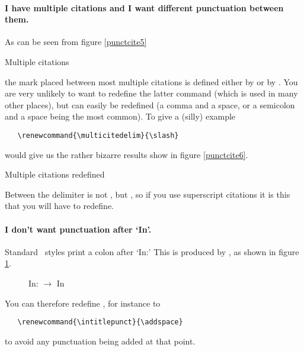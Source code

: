 \paragraph{I have multiple citations and I want different punctuation between them.} As can be seen from figure \ref{punctcite5}
\begin{marginfigure}[4ex]
\vspace{3pt}%
\caption{Multiple citations}\label{punctcite5}
\end{marginfigure}
the mark placed between most multiple citations is defined either by  or by . You are very unlikely to want to redefine the latter command (which is used in many other places), but  can easily be redefined (a comma and a space, or a semicolon and a space being the most common). To give a (silly) example
\begin{Verbatim}
   \renewcommand{\multicitedelim}{\slash}
\end{Verbatim}
would give us the rather bizarre results show in figure \ref{punctcite6}.
\begin{marginfigure}[-8ex]
\vspace{3pt}%
\caption{Multiple citations redefined}\label{punctcite6}
\end{marginfigure}

Between  the delimiter is not , but , so if you use superscript citations it is this that you will have to redefine.

\paragraph{I don't want punctuation after `In'.} Standard \biblatex\ styles print a colon after `In:' This is produced by , as shown in figure \ref{punctcite7}.
\begin{figure}
\caption{In: $\rightarrow$ In}\label{punctcite7}
\end{figure}

You can therefore redefine , for instance to
\begin{Verbatim}
   \renewcommand{\intitlepunct}{\addspace}
\end{Verbatim}
to avoid any punctuation being added at that point.


